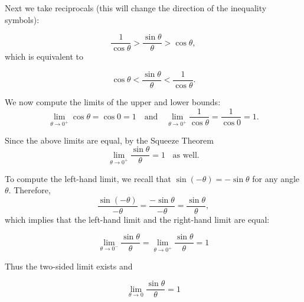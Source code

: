 \documentclass[handout]{ximera}
\begin{document}
\begin{example}[example 3]
Next we take reciprocals (this will change the direction of the inequality symbols):

\[
\frac{1}{\cos\theta}  > \frac{\sin\theta}{\theta} > \cos\theta,
\]
which is equivalent to 

\[
\cos\theta  < \frac{\sin\theta}{\theta} < \frac{1}{\cos\theta}.
\]

We now compute the limits of the upper and lower bounds:
\[
\lim_{\theta \to 0^+} \cos\theta = \cos 0 = 1 \quad \text{and} 
\quad \lim_{\theta \to 0^+} \frac{1}{\cos\theta} = \frac{1}{\cos 0} = 1. 
\]

Since the above limits are equal, by the Squeeze Theorem 
\[
\lim_{\theta \to 0^+} \frac{\sin\theta}{\theta} = 1 \;\; \text{  as well.}
\]

To compute the left-hand limit, we recall that $\sin(-\theta) = -\sin\theta$ for any angle $\theta$.
Therefore,
\[
\frac{\sin(-\theta)}{-\theta} = \frac{-\sin\theta}{-\theta} = \frac{\sin\theta}{\theta},
\]
which implies that the left-hand limit and the right-hand limit are equal:

\[
\lim_{\theta \to 0^-} \frac{\sin\theta}{\theta} =\lim_{\theta \to 0^+} \frac{\sin\theta}{\theta} = 1 
\]

Thus the two-sided limit exists and

\[
\lim_{\theta \to 0} \frac{\sin\theta}{\theta} =1
\]


\end{example}
\end{document}
